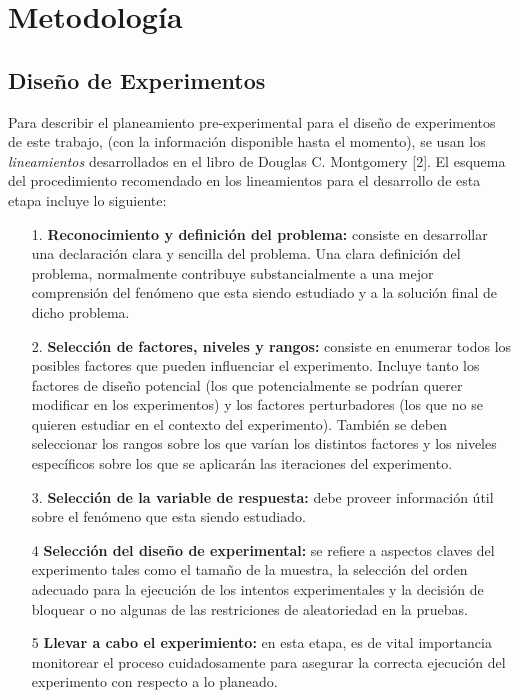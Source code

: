 \section{\textbf{Metodolog\'ia}}
\subsection{Dise\~no de Experimentos}
Para describir el planeamiento pre-experimental para el dise\~no de experimentos de este trabajo, (con la informaci\'on disponible hasta el momento), se usan los \textit{lineamientos} desarrollados en el libro de Douglas C. Montgomery [2]. El esquema del procedimiento recomendado en los lineamientos para el desarrollo de esta etapa incluye lo siguiente:
\begin{itemize}
\item [1.] \textbf{Reconocimiento y definici\'on del problema:} consiste en desarrollar una declaraci\'on clara y sencilla del problema. Una clara definici\'on del problema, normalmente contribuye substancialmente a una mejor comprensi\'on del fen\'omeno que esta siendo estudiado y a la soluci\'on final de dicho problema.
\item [2.] \textbf{Selecci\'on de factores, niveles y rangos:} consiste en enumerar todos los posibles factores que pueden influenciar el experimento. Incluye tanto los factores de dise\~no potencial (los que potencialmente se podr\'ian querer modificar en los experimentos) y los factores perturbadores (los que no se quieren estudiar en el contexto del experimento). Tambi\'en se deben seleccionar los rangos sobre los que var\'ian los distintos factores y los niveles espec\'ificos sobre los que se aplicar\'an las iteraciones del experimento.
\item [3.] \textbf{Selecci\'on de la variable de respuesta:} debe proveer informaci\'on \'util sobre el fen\'omeno que esta siendo estudiado.
\item [4] \textbf{Selecci\'on del dise\~no de experimental:} se refiere a aspectos claves del experimento tales como el tama\~no de la muestra, la selecci\'on del orden adecuado para la ejecuci\'on de los intentos experimentales y la decisi\'on de bloquear o no algunas de las restriciones de aleatoriedad en la pruebas.
\item [5] \textbf{Llevar a cabo el experimiento:} en esta etapa, es de vital importancia monitorear el proceso cuidadosamente para asegurar la correcta ejecuci\'on del experimento con respecto a lo planeado.
\end{itemize}

